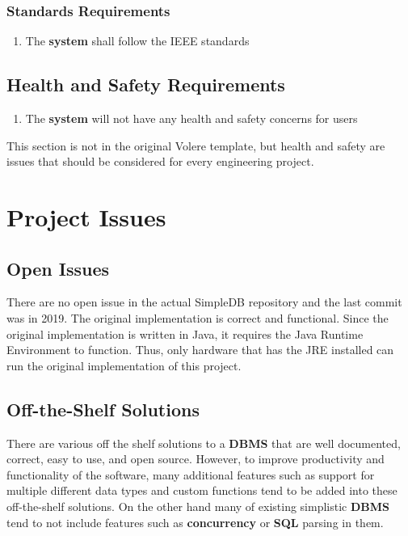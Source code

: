 \documentclass[12pt, titlepage]{article}
\begin{document}
    \subsubsection{Standards Requirements}
        \begin{enumerate}
            \item The \textbf{system} shall follow the IEEE standards
        \end{enumerate}
\subsection{Health and Safety Requirements}
    \begin{enumerate}
        \item The \textbf{system} will not have any health and safety concerns for users 
    \end{enumerate}
This section is not in the original Volere template, but health and safety are
issues that should be considered for every engineering project.

\section{Project Issues}

\subsection{Open Issues}

There are no open issue in the actual SimpleDB repository and the last commit was in 2019. The original implementation is correct and functional. Since the original implementation is written in Java, it requires the Java Runtime Environment to function. Thus, only hardware that has the JRE installed can run the original implementation of this project.

\subsection{Off-the-Shelf Solutions}

There are various off the shelf solutions to a \textbf{DBMS} that are well documented, correct, easy to use, and open source. However, to improve productivity and functionality of the software, many additional features such as support for multiple different data types and custom functions tend to be added into these off-the-shelf solutions. On the other hand many of existing simplistic \textbf{DBMS} tend to not include features such as \textbf{concurrency} or \textbf{SQL} parsing in them.\\
\end{document}
